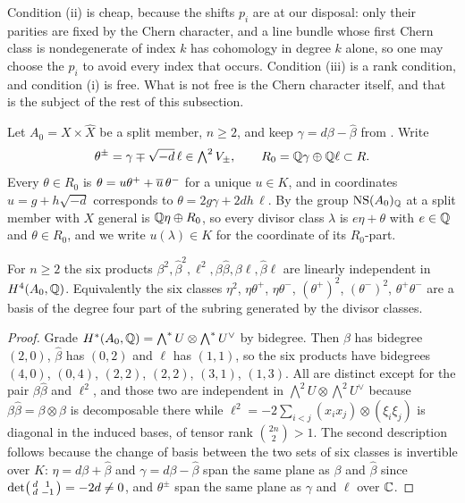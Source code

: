 Condition (ii) is cheap, because the shifts $p_{i}$ are at our disposal: only
their parities are fixed by the Chern character, and a line bundle whose first
Chern class is nondegenerate of index $k$ has cohomology in degree $k$ alone,
so one may choose the $p_{i}$ to avoid every index that occurs. Condition
(iii) is a rank condition, and condition (i) is free. What is not free is the
Chern character itself, and that is the subject of the rest of this
subsection.

\begin{notation}\label{not:splitcoords}
Let $A_{0}=X\times\widehat{X}$ be a split member, $n\ge2$, and keep
$\gamma=d\beta-\widehat{\beta}$ from \cite[Notation~15.1]{paperI}. Write
\[
  \theta^{\pm}=\gamma\mp\sqrt{-d}\,\ell\in\textstyle\bigwedge^{2}V_{\pm},
  \qquad
  R_{0}=\mathbb{Q}\gamma\oplus\mathbb{Q}\ell\subset R .
\]
Every $\theta\in R_{0}$ is $\theta=u\theta^{+}+\overline{u}\,\theta^{-}$ for a
unique $u\in K$, and in coordinates $u=g+h\sqrt{-d}$ corresponds to
$\theta=2g\gamma+2dh\,\ell$. By \cite[Proposition~15.19(iv)]{paperI} the group
$\mathrm{NS}(A_{0})_{\mathbb{Q}}$ at a split member with $X$ general is
$\mathbb{Q}\eta\oplus R_{0}$, so every divisor class $\lambda$ is $e\eta+\theta$ with
$e\in\mathbb{Q}$ and $\theta\in R_{0}$, and we write $u(\lambda)\in K$ for the
coordinate of its $R_{0}$-part.
\end{notation}

\begin{lemma}\label{lem:sixmonomials}
For $n\ge2$ the six products
$\beta^{2},\widehat\beta^{2},\ell^{2},\beta\widehat\beta,\beta\ell,
\widehat\beta\ell$
are linearly independent in $H^{4}(A_{0},\mathbb{Q})$. Equivalently the six classes
$\eta^{2}$, $\eta\theta^{+}$, $\eta\theta^{-}$, $(\theta^{+})^{2}$,
$(\theta^{-})^{2}$, $\theta^{+}\theta^{-}$ are a basis of the degree four part
of the subring generated by the divisor classes.
\end{lemma}

\begin{proof}
Grade $H^{*}(A_{0},\mathbb{Q})=\bigwedge^{*}U\otimes\bigwedge^{*}U^{\vee}$ by
bidegree. Then $\beta$ has bidegree $(2,0)$, $\widehat\beta$ has $(0,2)$ and
$\ell$ has $(1,1)$, so the six products have bidegrees $(4,0)$, $(0,4)$,
$(2,2)$, $(2,2)$, $(3,1)$, $(1,3)$. All are distinct except for the pair
$\beta\widehat\beta$ and $\ell^{2}$, and those two are independent in
$\bigwedge^{2}U\otimes\bigwedge^{2}U^{\vee}$ because
$\beta\widehat\beta=\beta\otimes\widehat\beta$ is decomposable there while
$\ell^{2}=-2\sum_{i<j}(x_{i}x_{j})\otimes(\xi_{i}\xi_{j})$ is diagonal in
the induced bases, of tensor rank $\binom{2n}{2}>1$. The second
description follows because the change of basis between the two sets of six
classes is invertible over $K$: $\eta=d\beta+\widehat\beta$ and
$\gamma=d\beta-\widehat\beta$ span the same plane as
$\beta$ and $\widehat\beta$ since $\det\begin{psmallmatrix}d&1\\
d&-1\end{psmallmatrix}=-2d\ne0$, and $\theta^{\pm}$ span the same plane
as $\gamma$ and $\ell$ over $\mathbb{C}$.
\end{proof}

